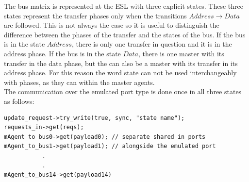 The bus matrix is represented at the ESL with three explicit states. These three states represent the transfer phases only when the transitions $Address\rightarrow Data$ are followed. This is not always the case so it is useful to distinguish the difference between the phases of the transfer and the states of the bus. If the bus is in the state $Address$, there is only one transfer in question and it is in the address phase. If the bus is in the state $Data$, there is one master with its transfer in the data phase, but the can also be a master with its transfer in its address phase. For this reason the word state can not be used interchangeably with phases, as they can within the master agents. \\
The communication over the emulated port type is done once in all three states as follows: \\
\begin{lstlisting}
update_request->try_write(true, sync, "state name");
requests_in->get(reqs);
mAgent_to_bus0->get(payload0); // separate shared_in ports 
mAgent_to_bus1->get(payload1); // alongside the emulated port
           .
           .
mAgent_to_bus14->get(payload14)
\end{lstlisting}   

